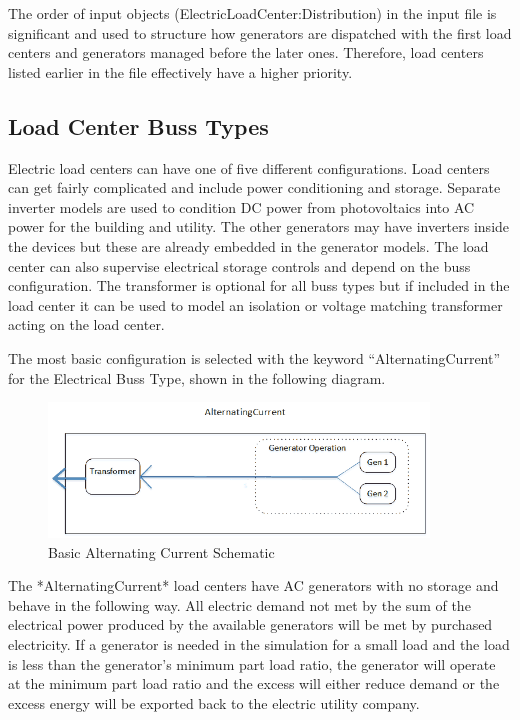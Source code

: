 The order of input objects (ElectricLoadCenter:Distribution) in the input file is significant and used to structure how generators are dispatched with the first load centers and generators managed before the later ones. Therefore, load centers listed earlier in the file effectively have a higher priority.

\subsection{Load Center Buss Types}

Electric load centers can have one of five different configurations. Load centers can get fairly complicated and include power conditioning and storage. Separate inverter models are used to condition DC power from photovoltaics into AC power for the building and utility. The other generators may have inverters inside the devices but these are already embedded in the generator models. The load center can also supervise electrical storage controls and depend on the buss configuration. The transformer is optional for all buss types but if included in the load center it can be used to model an isolation or voltage matching transformer acting on the load center.

The most basic configuration is selected with the keyword “AlternatingCurrent” for the Electrical Buss Type, shown in the following diagram.

\begin{figure}[hbtp] %
\centering
\includegraphics[width=0.9\textwidth, height=0.9\textheight, keepaspectratio=true]{media/ACBussDiagram.png}
\caption{Basic Alternating Current Schematic \protect \label{fig:basic-alternating-current-schematic}}
\end{figure}

The *AlternatingCurrent* load centers have AC generators with no storage and behave in the following way. All electric demand not met by the sum of the electrical power produced by the available generators will be met by purchased electricity.  If a generator is needed in the simulation for a small load and the load is less than the generator’s minimum part load ratio, the generator will operate at the minimum part load ratio and the excess will either reduce demand or the excess energy will be exported back to the electric utility company. 

